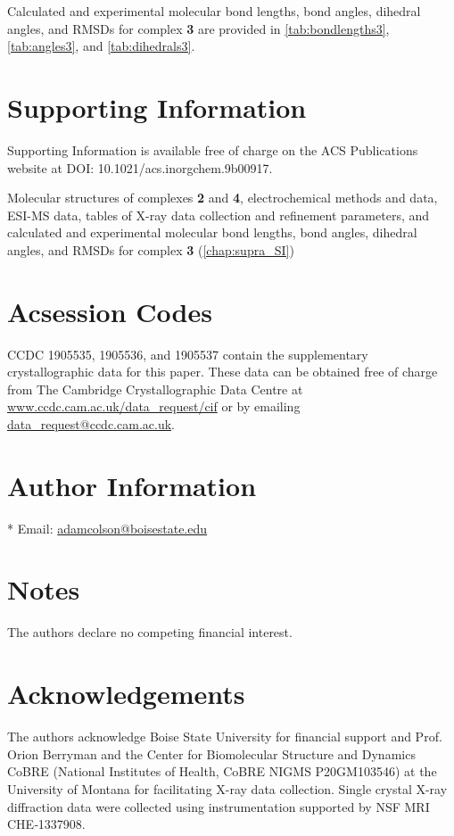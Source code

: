 Calculated and experimental molecular bond lengths, bond angles, dihedral angles, and RMSDs for complex \textbf{3} are provided in \autoref{tab:bondlengths3}, \autoref{tab:angles3}, and \autoref{tab:dihedrals3}. 

\section{Supporting Information}
Supporting Information is available free of charge on the ACS Publications website at DOI: 10.1021/acs.inorgchem.9b00917.

Molecular structures of complexes \textbf{2} and \textbf{4}, electrochemical methods and data, ESI-MS data, tables of X-ray data collection and refinement parameters, and calculated and experimental molecular bond lengths, bond angles, dihedral angles, and RMSDs for complex \textbf{3} (\autoref{chap:supra_SI}) 

\section{Acsession Codes}
CCDC 1905535, 1905536, and 1905537 contain the supplementary crystallographic data for this paper. These data can be obtained free of charge from The Cambridge Crystallographic Data Centre at \url{www.ccdc.cam.ac.uk/data_request/cif} or by emailing \href{mailto:data_request@ccdc.cam.ac.uk}{data\_request@ccdc.cam.ac.uk}.

\section{Author Information}
* Email: \href{mailto:adamcolson@boisestate.edu}{adamcolson@boisestate.edu}

\section{Notes}
The authors declare no competing financial interest.

\section{Acknowledgements}
The authors acknowledge Boise State University for financial support and Prof. Orion Berryman and the Center for Biomolecular Structure and Dynamics CoBRE (National Institutes of Health, CoBRE NIGMS P20GM103546) at the University of Montana for facilitating X-ray data collection. Single crystal X-ray diffraction data were collected using instrumentation supported by NSF MRI CHE‐1337908. 